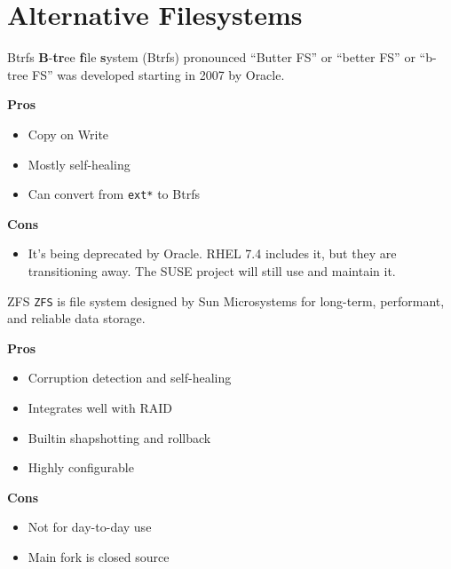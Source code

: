 \documentclass{lug}
\begin{document}
\section{Alternative Filesystems}
\begin{frame}{Btrfs}
    \textbf{B}-\textbf{tr}ee \textbf{f}ile \textbf{s}ystem (Btrfs) pronounced
    ``Butter FS'' or ``better FS'' or ``b-tree FS'' was developed starting in
    2007 by Oracle.

    \textbf{Pros}
    \begin{itemize}
        \item Copy on Write
        \item Mostly self-healing
        \item Can convert from \texttt{ext*} to Btrfs
    \end{itemize}

    \textbf{Cons}
    \begin{itemize}
        \item It's being deprecated by Oracle. RHEL 7.4 includes it, but they
            are transitioning away. The SUSE project will still use and maintain
            it.
    \end{itemize}
\end{frame}



\begin{frame}{ZFS}
\texttt{ZFS} is file system designed by Sun Microsystems for long-term,
performant, and reliable data storage.

\textbf{Pros}\begin{itemize}
    \item Corruption detection and self-healing
    \item Integrates well with RAID
    \item Builtin shapshotting and rollback
    \item Highly configurable
\end{itemize}

\textbf{Cons}\begin{itemize}
    \item Not for day-to-day use
    \item Main fork is closed source
\end{itemize}
\end{frame}
\end{document}
